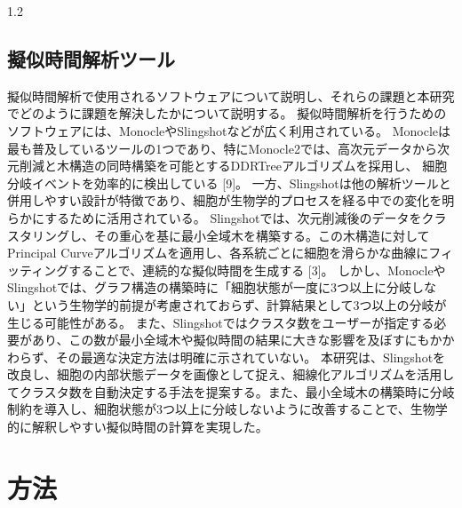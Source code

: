 \documentclass[dvipdfmx,11pt]{kuisthesis}
\begin{document}
\begin{spacing}{1.2}
\subsection{擬似時間解析ツール}\label{sec-intro-3}
擬似時間解析で使用されるソフトウェアについて説明し、それらの課題と本研究でどのように課題を解決したかについて説明する。
擬似時間解析を行うためのソフトウェアには、MonocleやSlingshotなどが広く利用されている。
Monocleは最も普及しているツールの1つであり、特にMonocle2では、高次元データから次元削減と木構造の同時構築を可能とするDDRTreeアルゴリズムを採用し、
細胞分岐イベントを効率的に検出している [9]。
一方、Slingshotは他の解析ツールと併用しやすい設計が特徴であり、細胞が生物学的プロセスを経る中での変化を明らかにするために活用されている。
Slingshotでは、次元削減後のデータをクラスタリングし、その重心を基に最小全域木を構築する。この木構造に対してPrincipal Curveアルゴリズムを適用し、各系統ごとに細胞を滑らかな曲線にフィッティングすることで、連続的な擬似時間を生成する [3]。
しかし、MonocleやSlingshotでは、グラフ構造の構築時に「細胞状態が一度に3つ以上に分岐しない」という生物学的前提が考慮されておらず、計算結果として3つ以上の分岐が生じる可能性がある。
また、Slingshotではクラスタ数をユーザーが指定する必要があり、この数が最小全域木や擬似時間の結果に大きな影響を及ぼすにもかかわらず、その最適な決定方法は明確に示されていない。
本研究は、Slingshotを改良し、細胞の内部状態データを画像として捉え、細線化アルゴリズムを活用してクラスタ数を自動決定する手法を提案する。また、最小全域木の構築時に分岐制約を導入し、細胞状態が3つ以上に分岐しないように改善することで、生物学的に解釈しやすい擬似時間の計算を実現した。
\newpage
\section{方法}\label{sec-structure}


\end{spacing}
\end{document}
